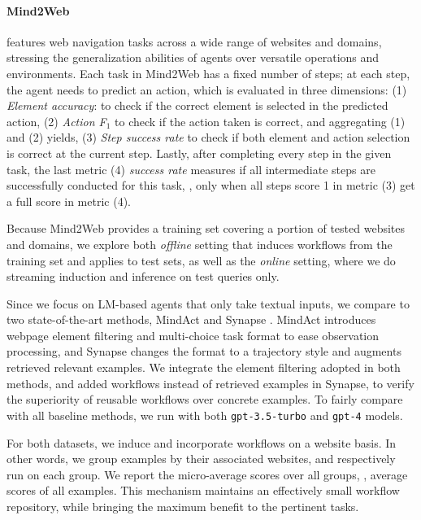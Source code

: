 \paragraph{Mind2Web}
\citep{deng2023mindweb} features web navigation tasks across a wide range of websites and domains, stressing the generalization abilities of agents over versatile operations and environments. 
Each task in Mind2Web has a fixed number of steps; at each step, the agent needs to predict an action, which is evaluated in three dimensions: (1) \textit{Element accuracy}: to check if the correct element is selected in the predicted action, (2) \textit{Action F$_1$} to check if the action taken is correct, and aggregating (1) and (2) yields, (3) \textit{Step success rate} to check if both element and action selection is correct at the current step. Lastly, after completing every step in the given task, the last metric (4) \textit{success rate} measures if all intermediate steps are successfully conducted for this task, \ie, only when all steps score 1 in metric (3) get a full score in metric (4).

Because Mind2Web provides a training set covering a portion of tested websites and domains, we explore both \textit{offline} setting that induces workflows from the training set and applies to test sets, as well as the \textit{online} setting, where we do streaming induction and inference on test queries only.

Since we focus on LM-based agents that only take textual inputs, we compare \awm to two state-of-the-art methods, MindAct \citep{deng2023mindweb} and Synapse \citep{zheng2024synapse}. MindAct introduces webpage element filtering and multi-choice task format to ease observation processing, and Synapse changes the format to a trajectory style and augments retrieved relevant examples. We integrate the element filtering adopted in both methods, and added workflows instead of retrieved examples in Synapse, to verify the superiority of reusable workflows over concrete examples. To fairly compare with all baseline methods, we run \awm with both \texttt{gpt-3.5-turbo} and \texttt{gpt-4} models.

For both datasets, we induce and incorporate workflows on a website basis. In other words, we group examples by their associated websites, and respectively run \awm on each group. We report the micro-average scores over all groups, \ie, average scores of all examples. This mechanism maintains an effectively small workflow repository, while bringing the maximum benefit to the pertinent tasks.



